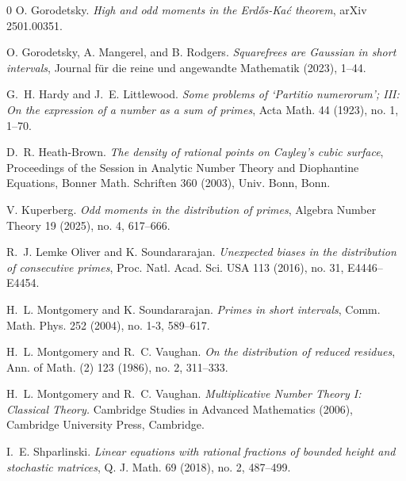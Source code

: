 \documentclass[11pt,letterpaper]{amsart}
\theoremstyle{definition}
\begin{document}
\begin{thebibliography}{0}
O. Gorodetsky. \textit{High and odd moments in the Erd\H{o}s-Ka\'c theorem}, arXiv 2501.00351.

O. Gorodetsky, A. Mangerel, and B. Rodgers. \textit{Squarefrees are Gaussian in short intervals}, Journal f\"{u}r die reine und angewandte Mathematik (2023), 1--44.

G.~H. Hardy and J.~E. Littlewood. \textit{Some problems of `{P}artitio numerorum'; {III}: {O}n the expression of a number as a sum of primes},
Acta Math. 44 (1923), no. 1, 1--70.

D.~R. Heath-Brown. \textit{The density of rational points on {C}ayley's cubic surface}, Proceedings of the {S}ession in {A}nalytic {N}umber {T}heory and {D}iophantine {E}quations, Bonner Math. Schriften 360 (2003), Univ. Bonn, Bonn.

V. Kuperberg.
\textit{Odd moments in the distribution of primes}, Algebra Number Theory 19 (2025), no. 4, 617--666.

R.~J. Lemke Oliver and K. Soundararajan.
\textit{Unexpected biases in the distribution of consecutive primes},
Proc. Natl. Acad. Sci. USA 113 (2016), no. 31, E4446–E4454. 

H.~L. Montgomery and K. Soundararajan.
\textit{Primes in short intervals}, Comm. Math. Phys. 252 (2004), no. 1-3, 589–617.

H.~L. Montgomery and R.~C. Vaughan.
\textit{On the distribution of reduced residues}, Ann. of Math. (2) 123 (1986), no. 2, 311--333.

H.~L. Montgomery and R.~C. Vaughan.
\textit{Multiplicative Number Theory I: Classical Theory.} Cambridge Studies in Advanced Mathematics (2006), Cambridge University Press, Cambridge.

I.~E. Shparlinski. \textit{Linear equations with rational fractions of bounded height and stochastic matrices}, Q. J. Math. 69 (2018), no. 2, 487--499.

\end{thebibliography}
\end{document}

